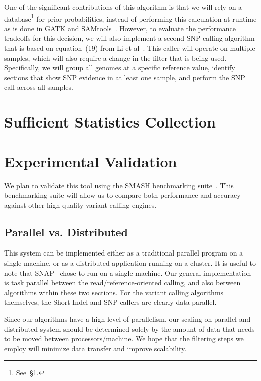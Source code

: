 \documentclass[11pt]{article}
\begin{document}
One of the significant contributions of this algorithm is that we will rely on a database\footnote{See~\S\ref{sec:sufficient-statistics}.}
for prior probabilities, instead of performing this calculation at runtime as is done in GATK and SAMtools~\cite{mckenna10, li11}.
However, to evaluate the performance tradeoffs for this decision, we will also implement a second SNP calling algorithm that is
based on equation~(19) from Li et al~\cite{li11}. This caller will operate on multiple samples, which will also require a change in
the filter that is being used. Specifically, we will group all genomes at a specific reference value, identify sections that show SNP
evidence in at least one sample, and perform the SNP call across all samples.

\section{Sufficient Statistics Collection}
\label{sec:sufficient-statistics}

\section{Experimental Validation}
\label{sec:experimental-validation}

We plan to validate this tool using the SMASH benchmarking suite~\cite{talwalkar13}. This benchmarking suite will allow us to
compare both performance and accuracy against other high quality variant calling engines.

\subsection{Parallel vs. Distributed}
\label{sec:parallel-vs-distributed}

This system can be implemented either as a traditional parallel program on a single machine, or as a distributed application
running on a cluster. It is useful to note that SNAP~\cite{zaharia11} chose to run on a single machine. Our general implementation
is task parallel between the read/reference-oriented calling, and also between algorithms within these two sections. For the
variant calling algorithms themselves, the Short Indel and SNP callers are clearly data parallel.

Since our algorithms have a high level of parallelism, our scaling on parallel and distributed system should be determined solely
by the amount of data that needs to be moved between processors/machine. We hope that the filtering steps we employ will
minimize data transfer and improve scalability.
\end{document}
